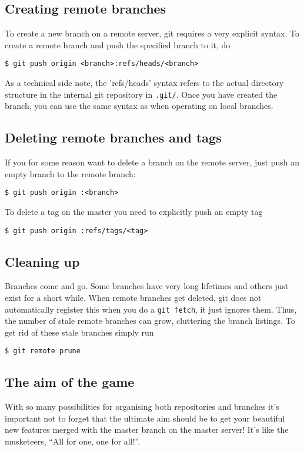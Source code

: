 \documentclass[a4paper,10pt]{article}
\begin{document}
\subsection{Creating remote branches} 
To create a new branch on a remote server, git
requires a very explicit syntax. To create a remote 
branch and push the specified branch to it, do
\begin{verbatim}
$ git push origin <branch>:refs/heads/<branch>
\end{verbatim}
As a technical side note, the 'refs/heads' syntax refers to the actual
directory structure in the internal git repository in \texttt{.git/}.
Once you have created the branch, you can
use the same syntax as when operating on local branches. 

\subsection{Deleting remote branches and tags}
If you for some reason want to delete a branch
on the remote server, just push an empty branch to the remote branch:
\begin{verbatim}
$ git push origin :<branch>
\end{verbatim}

To delete a tag on the master you need to explicitly push an empty tag
\begin{verbatim}
$ git push origin :refs/tags/<tag>
\end{verbatim}

\subsection{Cleaning up}
Branches come and go. Some branches have very long lifetimes and others just
exist for a short while. When remote branches get deleted, git does not
automatically register this when you do a \texttt{git fetch}, it just ignores
them. Thus, the number of stale remote branches can grow, cluttering the
branch listings. To get rid of these stale branches simply run 
\begin{verbatim}
$ git remote prune
\end{verbatim}

\subsection{The aim of the game}
With so many possibilities for organising both repositories and branches it's
important not to forget that the ultimate aim should be to get your beautiful
new features merged with the master branch on the master server! It's like the
musketeers, ``All for one, one for all!''. 
\end{document}
